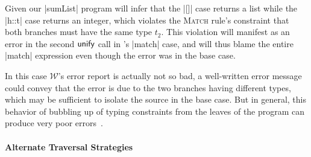 Given our |sumList| program \W will infer that the |[]| case
returns a list while the |h::t| case returns an integer, which violates
the \textsc{Match} rule's constraint that both branches must have the
same type $t_2$.
%
This violation will manifest as an error in the second $\mathsf{unify}$
call in \W's |match| case, and \W will thus blame
the entire |match| expression
even though the error was in the base case.

In this case $\mathcal{W}$'s error report is actually not so
bad, a well-written error message could convey that the error is due to
the two branches having different types, which may be sufficient to
isolate the source in the base case.
%
But in general, this behavior of bubbling up of typing constraints from
the leaves of the program can produce very poor errors~\citep[see
Fig. 1 for a particularly pathological example]{Lee1998-ys}.
%

\paragraph{Alternate Traversal Strategies}

